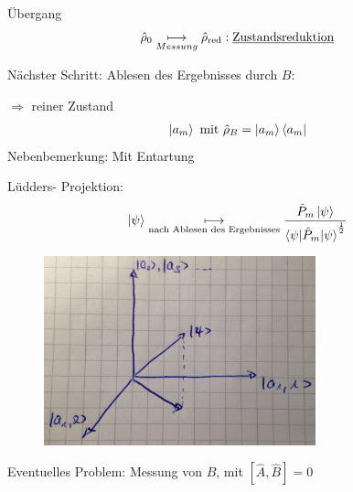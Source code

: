 	Übergang
		\begin{align*}
			\hat{\rho}_0 \underset{Messung}{\longmapsto} \hat{\rho}_{\text{red}}:
			\text{\underline{Zustandsreduktion}}
		\end{align*}
		
	Nächster Schritt: Ablesen des Ergebnisses durch $B$:
	
	$\Rightarrow$ reiner Zustand
		\begin{align*}
			\ket{a_m} \text{ mit } \hat{\rho}_B = \ket{a_m} \bra{a_m}
		\end{align*}
	Nebenbemerkung: Mit Entartung
		
	Lüdders- Projektion:
		\begin{align*}
			\ket{\psi} \underset{\text{nach Ablesen des Ergebnisses}}{\longmapsto} 
			\frac{\hat{P}_m \ket{\psi}}{\braket{\psi | \hat{P}_m | \psi}^{\frac{1}{2}}}
		\end{align*}
	\begin{figure}
		\begin{center}
			\includegraphics[width=0.7\textwidth]{Messung2}
		\end{center}
	\end{figure}
	
	Eventuelles Problem: Messung von $B$, mit $[\hat{A}, \hat{B}] = 0$
	

